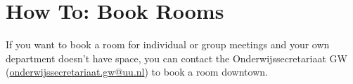 \chapter{How To: Book Rooms}

If you want to book a room for individual or group meetings and your own department doesn't have space, you can contact the Onderwijssecretariaat GW (\href{mailto:onderwijssecretariaat.gw@uu.nl}{onderwijssecretariaat.gw@uu.nl}) to book a room downtown.
